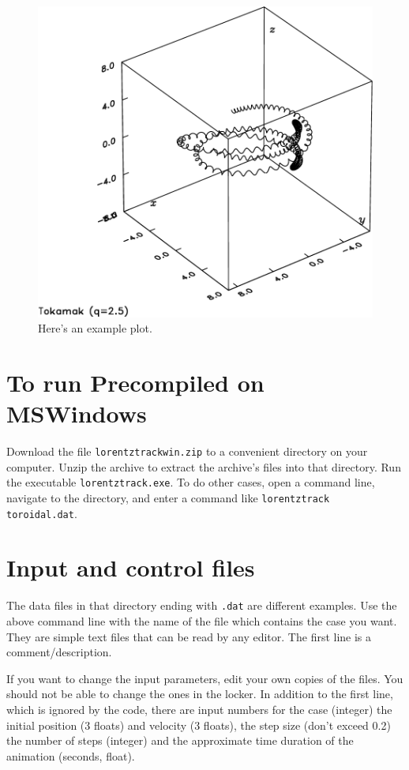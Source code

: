\documentclass[12pt]{article}
\begin{document}
\begin{figure}[htp]
  \centering
\includegraphics[width=4 truein]{toktrack}  
  \caption{Here's an example plot.}
  \label{fig:toktrack}
\end{figure}

\section{To run Precompiled on MSWindows}

Download the file \verb!lorentztrackwin.zip! to a convenient directory
on your computer. Unzip the archive to extract the archive's files
into that directory. Run the executable \verb!lorentztrack.exe!. To do
other cases, open a command line, navigate to the directory, and enter
a command like \verb!lorentztrack toroidal.dat!.


\section{Input and control files}

The data files in that directory ending with \verb!.dat! are different
examples. Use the above command line with the
name of the file which contains the case you want. They are simple
text files that can be read by any editor. The first line is a
comment/description. 

If you want to change the input parameters, edit your own copies of
the files. You should not be able to change the ones in the locker. In
addition to the first line, which is ignored by the code, there are
input numbers for the case (integer) the initial position (3 floats)
and velocity (3 floats), the step size (don't exceed 0.2) the number
of steps (integer) and the approximate time duration of the animation
(seconds, float).
\end{document}

